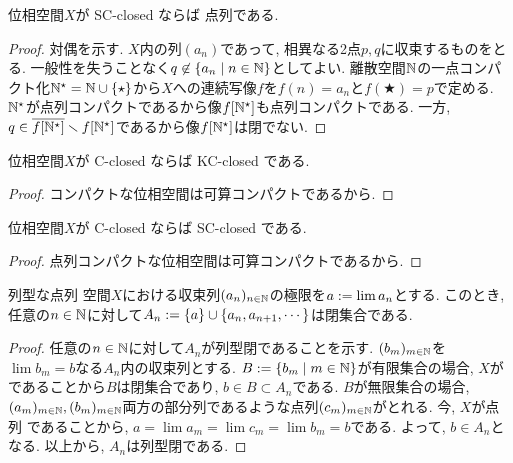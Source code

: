 \documentclass[uplatex, dvipdfmx, a4paper, 12pt, class=jsbook, crop=false]{standalone}
\begin{document}
\begin{proposition}
	位相空間$X$が SC-closed ならば 点列\Hausdorff である.
\end{proposition}
\begin{proof}
	対偶を示す. $X$内の列$(a_n)$であって, 相異なる2点$p, q$に収束するものをとる. 一般性を失うことなく$q \not\in \setcomp{a_n}{n \in \N}$としてよい. 離散空間$\mathbb{N}$の一点コンパクト化$\mathbb{N}^\star = \mathbb{N} \cup \{\star\}$から$X$への連続写像$f$を$f(n) = a_n$と$f(\bigstar) = p$で定める. $\mathbb{N}^\star$が点列コンパクトであるから像$f[\mathbb{N}^\star]$も点列コンパクトである. 一方, $q \in \overline{f[\mathbb{N}^\star]} \smallsetminus f[\mathbb{N}^\star]$であるから像$f[\mathbb{N}^\star]$は閉でない.
\end{proof}

\begin{proposition}
	位相空間$X$が C-closed ならば KC-closed である.
\end{proposition}
\begin{proof}
	コンパクトな位相空間は可算コンパクトであるから.
\end{proof}

\begin{proposition}
	位相空間$X$が C-closed ならば SC-closed である.
\end{proposition}
\begin{proof}
	点列コンパクトな位相空間は可算コンパクトであるから.
\end{proof}

\begin{lemma}
	\label{lem:Lemma used in the proof of the equivalence between C-closed and SeqHaus}
	列型な点列 \Hausdorff 空間$ X $における収束列$ (a_n)_{n \in \mathbb{N}} $の極限を$ a \mathrel{:=} \lim a_n $とする. このとき, 任意の$ n \in \mathbb{N} $に対して$ A_n \mathrel{:=} \{a\} \cup \{a_n, a_{n+1}, \cdots\} $は閉集合である.
\end{lemma}

\begin{proof}
	任意の$ n \in \mathbb{N} $に対して$ A_n $が列型閉であることを示す. $ (b_m)_{m \in \mathbb{N}} $を$ \lim b_m = b $なる$ A_n $内の収束列とする. $ B \defeq \setcomp{b_m}{m \in \N} $が有限集合の場合, $ X $がであることから$ B $は閉集合であり, $ b \in B \subset A_n $である. $ B $が無限集合の場合, $ (a_m)_{m \in \mathbb{N}}, (b_m)_{m \in \mathbb{N}} $両方の部分列であるような点列$ (c_m)_{m \in \mathbb{N}} $がとれる. 今, $ X $が点列 \Hausdorff であることから, $ a = \lim a_m = \lim c_m = \lim b_m =b $である. よって, $ b \in A_n $となる. 以上から, $ A_n $は列型閉である.
\end{proof}
\end{document}
